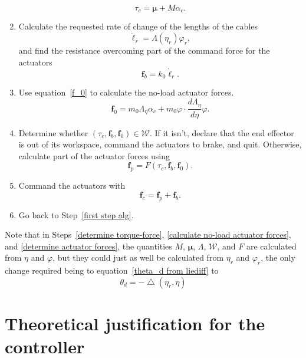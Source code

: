 \documentclass[reqno,twocolumn]{amsart}
\newcommand{\liediff}{\mathbin{\triangle}}
\renewcommand{\mathsf}{}
\begin{document}
\begin{enumerate}
\begin{equation}
\tau_c = \bm \mu + \mathsf M \alpha_c.
\end{equation}
\item \label{back-emf} Calculate the requested rate of change of the lengths of the cables
\begin{equation}
\dot{\bm \ell}_r = \mathsf\Lambda(\eta_r) \varphi_r,
\end{equation}
and find the resistance overcoming part of the command force for the actuators
\begin{equation}
\label{f_b}
\bm f_b = k_0 \dot{\bm\ell}_r .
\end{equation}
\item \label{calculate no-load actuator forces} Use equation~\eqref{f_0} to calculate the no-load actuator forces.
\begin{equation}
\bm f_0 = m_0 \mathsf\Lambda_\eta \alpha_c + m_0 \varphi \cdot \frac{d\Lambda_\eta}{d\eta} \varphi .
\end{equation}
\item \label{determine actuator forces} Determine whether $(\tau_c,\bm f_b,\bm f_0) \in \mathcal W$.  If it isn't, declare that the end effector is out of its workspace, command the actuators to brake, and quit.  Otherwise, calculate part of the actuator forces using
\begin{equation}
\label{f_p}
\bm f_p = \mathsf F(\tau_c, \bm f_b,\bm f_0) .
\end{equation}
\item \label{command cables} Command the actuators with
\begin{equation}
\label{f_c}
\bm f_c = \bm f_p + \bm f_b .
\end{equation}
\item Go back to Step~\ref{first step alg}.
\end{enumerate}
Note that in Steps~\ref{determine torque-force}, \ref{calculate no-load actuator forces}, and \ref{determine actuator forces}, the quantities $\mathsf M$, $\boldsymbol\mu$, $\mathsf\Lambda$, $\mathcal W$, and $\mathsf F$ are calculated from $\eta$ and $\varphi$, but they could just as well be calculated from $\eta_r$ and $\varphi_r$, the only change required being to equation~\eqref{theta_d from liediff} to
\begin{equation}
\theta_d = - \liediff(\eta_r, \eta)
\end{equation}

\section{Theoretical justification for the controller}
\label{sec theoretical}
\end{document}
